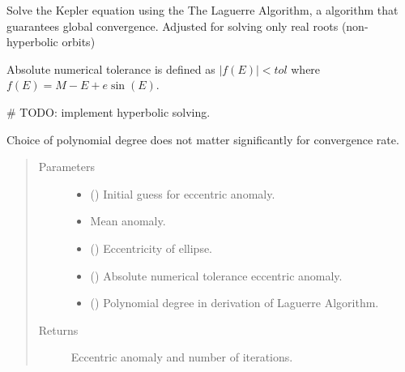 \documentclass[letterpaper,10pt,english]{sphinxmanual}
\begin{document}

\begin{fulllineitems}
\label{\detokenize{modules/dpt_tools:dpt_tools.laguerre_solve_kepler}}
Solve the Kepler equation using the The Laguerre Algorithm, a algorithm that guarantees global convergence.
Adjusted for solving only real roots (non-hyperbolic orbits)

Absolute numerical tolerance is defined as \(|f(E)| < tol\) where \(f(E) = M - E + e \sin(E)\).

\# TODO: implement hyperbolic solving.

 Choice of polynomial degree does not matter significantly for convergence rate.
\begin{quote}\begin{description}
\item[{Parameters}] \leavevmode\begin{itemize}
\item {} 
 () \textendash{} Initial guess for eccentric anomaly.

\item {} 
 \textendash{} Mean anomaly.

\item {} 
 () \textendash{} Eccentricity of ellipse.

\item {} 
 () \textendash{} Absolute numerical tolerance eccentric anomaly.

\item {} 
 () \textendash{} Polynomial degree in derivation of Laguerre Algorithm.

\end{itemize}

\item[{Returns}] \leavevmode
Eccentric anomaly and number of iterations.


\end{description}
\end{quote}
\end{fulllineitems}
\end{document}
